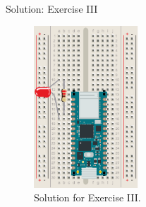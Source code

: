 \begin{frame}{Solution: Exercise III}
    \begin{figure}
        \includegraphics[width=0.35\textwidth]{images/microcontroller/exercises/exercise-2-solution.pdf}
        \caption{Solution for Exercise III.}
    \end{figure}
\end{frame}